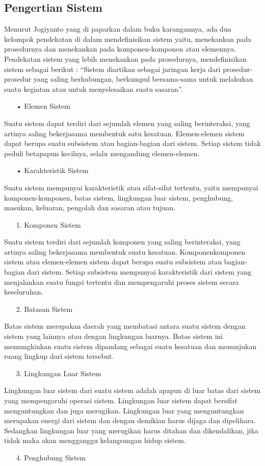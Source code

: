 \documentclass{jtetiproposalskripsi}
\begin{document}
\subsection{Pengertian Sistem}
Menurut Jogiyanto yang di paparkan dalam buku karangannya, ada dua kelompok pendekatan di dalam mendefinisikan sistem yaitu, menekankan pada prosedurnya dan menekankan pada komponen-komponen atau elemennya. 
Pendekatan sistem yang lebih menekankan pada prosedurnya, mendefinisikan sistem sebagai berikut :
“Sistem diartikan sebagai jaringan kerja dari prosedur-prosedur yang saling berhubungan, berkumpul bersama-sama untuk melakukan suatu kegiatan atau untuk menyelesaikan suatu sasaran”.
\begin{itemize}
\item[•] Elemen Sistem 
\end{itemize}
Suatu sistem dapat terdiri dari sejumlah elemen yang saling berinteraksi, yang artinya saling bekerjasama membentuk satu kesatuan. Elemen-elemen sistem dapat berupa suatu subsistem atau bagian-bagian dari sistem. Setiap sistem tidak peduli betapapun kecilnya, selalu mengandung elemen-elemen.
\begin{itemize}
\item[•] Karakteristik Sistem
\end{itemize}
Suatu sistem mempunyai karakteristik atau sifat-sifat tertentu, yaitu mempunyai komponen-komponen, batas sistem, lingkungan luar sistem, penghubung, masukan, keluaran, pengolah dan sasaran atau tujuan.
\begin{itemize}
\item[1.] Komponen Sistem
\end{itemize}
Suatu sistem terdiri dari sejumlah komponen yang saling berinteraksi, yang artinya saling bekerjasama membentuk suatu kesatuan. Komponenkomponen sistem atau elemen-elemen sistem dapat berupa suatu subsistem atau bagian-bagian dari sistem. Setiap subsistem mempunyai karakteristik dari sistem yang menjalankan suatu fungsi tertentu dan mempengaruhi proses sistem secara keseluruhan.
\begin{itemize}
\item[2.] Batasan Sistem
\end{itemize}
Batas sistem merupakan daerah yang membatasi antara suatu sistem dengan sistem yang lainnya atau dengan lingkungan luarnya. Batas sistem ini memungkinkan suatu sistem dipandang sebagai suatu kesatuan dan menunjukan ruang lingkup dari sistem tersebut.
\begin{itemize}
\item[3.] Lingkungan Luar Sistem
\end{itemize}
Lingkungan luar sistem dari suatu sistem adalah apapun di luar batas dari sistem yang mempengaruhi operasi sistem. Lingkungan luar sistem dapat bersifat menguntungkan dan juga merugikan. Lingkungan luar yang menguntungkan merupakan energi dari sistem dan dengan demikian harus dijaga dan dipelihara. Sedangkan lingkungan luar yang merugikan harus ditahan dan dikendalikan, jika tidak maka akan mengganggu kelangsungan hidup sistem.
\begin{itemize}
\item[4.] Penghubung Sistem
\end{itemize}
\end{document}
